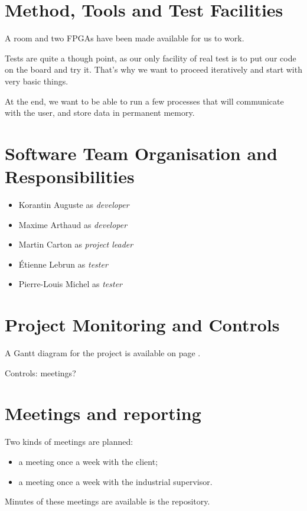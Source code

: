 \documentclass{article}
\begin{document}
  \section{Method, Tools and Test Facilities}
    A room and two FPGAs have been made available for us to work.

    Tests are quite a though point, as our only facility of real test is to put
    our code on the board and try it. That's why we want to proceed iteratively
    and start with very basic things.

    At the end, we want to be able to run a few processes that will communicate
    with the user, and store data in permanent memory.

  \section{Software Team Organisation and Responsibilities}
    \begin{itemize}
      \item Korantin Auguste as \textit{developer}
      \item Maxime Arthaud as \textit{developer}
      \item Martin Carton as \textit{project leader}
      \item Étienne Lebrun as \textit{tester}
      \item Pierre-Louis Michel as \textit{tester}
    \end{itemize}

  \section{Project Monitoring and Controls}
    A Gantt diagram for the project is available on page \pageref{fig:gantt}.

    Controls: meetings?

    \afterpage{}

  \section{Meetings and reporting}
    Two kinds of meetings are planned:
    \begin{itemize}
        \item a meeting once a week with the client;
        \item a meeting once a week with the industrial supervisor.
    \end{itemize}
    Minutes of these meetings are available is the repository.
\end{document}
